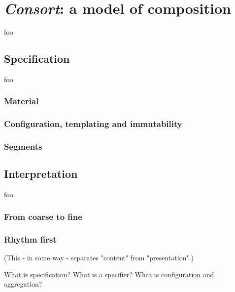 \chapter{\emph{Consort}: a model of composition}

foo

\section{Specification}

foo

\subsection{Material}

\subsection{Configuration, templating and immutability}

\subsection{Segments}

\section{Interpretation}

foo

\subsection{From coarse to fine}

\subsection{Rhythm first}

(This - in some way - separates "content" from "presentation".)

What is specification? What is a specifier? What is configuration and
aggregation?

